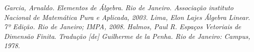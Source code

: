 
\begin{thebibliography}{99}


        \textit{Garcia, Arnaldo.} {\it Elementos de Álgebra}. \textit{Rio de Janeiro. Associação instituto Nacional de Matemática Pura e Aplicada, 2003.}
        \textit{Lima, Elon Lajes} {\it Álgebra Linear}. \textit{7º Edição. Rio de Janeiro; IMPA, 2008.}
        \textit{Halmos, Paul R.} {\it Espaços Vetoriais de Dimensão Finita}. \textit{Tradução [de] Guilherme de la Penha. Rio de Janeiro: Campus, 1978.}
      
      
       \end{thebibliography}
